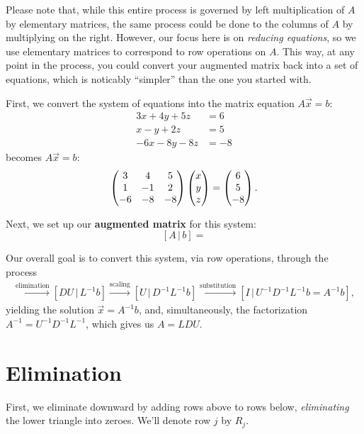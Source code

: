 \documentclass[10pt]{article}
\begin{document}
\vspace{5mm}

Please note that, while this entire process is governed by left multiplication of $A$ by elementary matrices, the same process could be done to the columns of $A$ by multiplying on the right. However, our focus here is on \emph{reducing equations}, so we use elementary matrices to correspond to row operations on $A$. This way, at any point in the process, you could convert your augmented matrix back into a set of equations, which is noticably ``simpler'' than the one you started with.

First, we convert the system of equations into the matrix equation $A \vec{x} = b $: 
\begin{align*}
3x + 4y + 5z & = 6 \\
x - y + 2z & = 5 \\
-6x - 8y - 8z & = -8 
\end{align*}
becomes $A \vec{x} = b$: 
\[ \begin{pmatrix} 3 & 4 & 5 \\ 1 & -1 & 2 \\ -6 & -8 & -8 \end{pmatrix} \begin{pmatrix} x \\ y \\ z \end{pmatrix} = \begin{pmatrix} 6 \\ 5 \\ -8 \end{pmatrix}. \]

Next, we set up our \textbf{augmented matrix} for this system: 
\[ [A \, | \, b] =  \]


Our overall goal is to convert this system, via row operations, through the process 
\begin{align*}
[A \, | \, b] \xrightarrow{\text{elimination}} [DU \, | \, L^{-1} b] \xrightarrow{\text{scaling}} [U \, | \, D^{-1} L^{-1} b] 
 \xrightarrow{\text{substitution}} [ I \, | \, U^{-1} D^{-1} L^{-1} b = A^{-1} b], 
\end{align*}
yielding the solution $\vec{x} = A^{-1} b$, and, simultaneously, the factorization $A^{-1} = U^{-1} D^{-1} L^{-1}$, which gives us $A = LDU$. 


\section{Elimination}

First, we eliminate downward by adding rows above to rows below, \emph{eliminating} the lower triangle into zeroes. We'll denote row $j$ by $R_j$.
\end{document}
